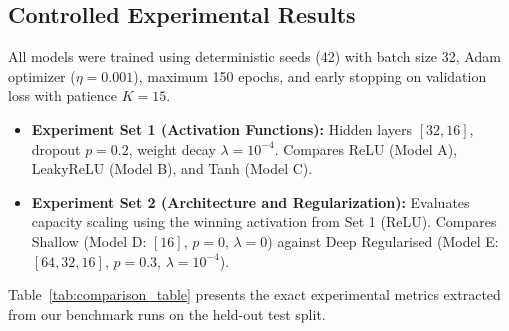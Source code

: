 \documentclass[11pt,a4paper]{article}
\begin{document}
\subsection{Controlled Experimental Results}
All models were trained using deterministic seeds (42) with batch size 32, Adam optimizer ($\eta=0.001$), maximum 150 epochs, and early stopping on validation loss with patience $K=15$.
\begin{itemize}[leftmargin=*]
    \item \textbf{Experiment Set 1 (Activation Functions):} Hidden layers $[32, 16]$, dropout $p=0.2$, weight decay $\lambda=10^{-4}$. Compares ReLU (Model A), LeakyReLU (Model B), and Tanh (Model C).
    \item \textbf{Experiment Set 2 (Architecture and Regularization):} Evaluates capacity scaling using the winning activation from Set 1 (ReLU). Compares Shallow (Model D: $[16]$, $p=0$, $\lambda=0$) against Deep Regularised (Model E: $[64, 32, 16]$, $p=0.3$, $\lambda=10^{-4}$).
\end{itemize}

Table~\ref{tab:comparison_table} presents the exact experimental metrics extracted from our benchmark runs on the held-out test split.
\end{document}

